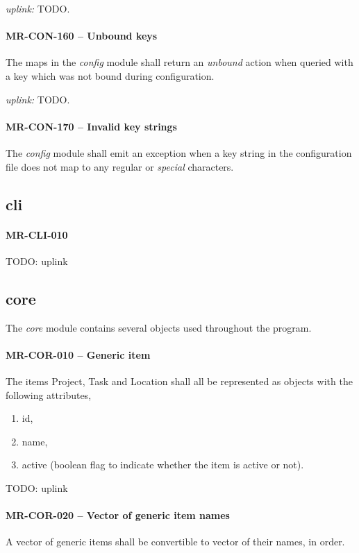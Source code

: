 \textit{uplink: } TODO.

\paragraph{MR-CON-160 -- Unbound keys}
The maps in the \emph{config} module shall return an \emph{unbound}
action when queried with a key which was not bound during configuration.

\textit{uplink: } TODO.

\paragraph{MR-CON-170 -- Invalid key strings}
The \emph{config} module shall emit an exception when a key
string in the configuration file does not map to any regular or \emph{special}
characters.

\subsection{cli}
\paragraph{MR-CLI-010}
TODO: uplink

\subsection{core}
The \emph{core} module contains several objects used throughout the program.

\paragraph{MR-COR-010 -- Generic item}
The items Project, Task and Location shall all be represented as objects with
the following attributes,
\begin{enumerate}
\item id,
\item name,
\item active (boolean flag to indicate whether the item is active or not).
\end{enumerate}
TODO: uplink

\paragraph{MR-COR-020 -- Vector of generic item names}
A vector of generic items shall be convertible to vector of their names,
in order.

